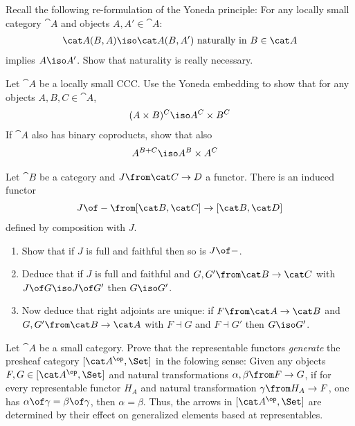 \begin{exercise}
  Recall the following re-formulation of the Yoneda principle: For any locally small category $\cat A$ and objects $A,A'\in\cat A$:
  \begin{align*}
    \cat A(B,A)\iso \cat  A(B,A')\text{ naturally in } B\in\cat A
  \end{align*}
implies $A\iso A'$. Show that naturality is really necessary.
\end{exercise}

\begin{exercise}
  Let $\cat A$ be a locally small CCC. Use the Yoneda embedding to show that for any objects $A,B,C\in\cat A$,
  \begin{align*}
    (A\times B)^C\iso A^C\times B^C
  \end{align*}
  If $\cat A$ also has binary coproducts, show that also
  \begin{align*}
    A^{B+C}&\iso A^B\times A^C
  \end{align*}
\end{exercise}

\begin{exercise}
  Let $\cat B$ be a category and $J\from\cat C\to D$ a functor. There is an induced functor
  \begin{align*}
    J\of -\from[\cat B,\cat C]\to [\cat B,\cat D]
  \end{align*}
  defined by composition with $J$.
  \begin{enumerate}
  \item Show that if $J$ is full and faithful then so is $J\of -$.
  \item Deduce that if $J$ is full and faithful and $G,G'\from\cat B\to\cat C$ with $J\of G\iso J\of G'$ then $G\iso G'$.
  \item Now deduce that right adjoints are unique: if $F\from \cat A\to\cat B$ and $G,G'\from\cat B\to \cat A$ with $F\dashv G$ and $F\dashv G'$ then $G\iso G'$. 
  \end{enumerate}
\end{exercise}

\begin{exercise}
  Let $\cat A$ be a small category. Prove that the representable functors \emph{generate} the presheaf category $[\cat A^\op,\Set]$ in the folowing sense: Given any objects $F,G\in[\cat A^\op,\Set]$ and natural transformations $\alpha,\beta\from F\to G$, if for every representable functor $H_A$ and natural transformation $\gamma\from H_A\to F$, one has $\alpha\of\gamma=\beta\of\gamma$, then $\alpha=\beta$. Thus, the arrows in $[\cat A^\op,\Set]$ are determined by their effect on generalized elements based at representables.
\end{exercise}

